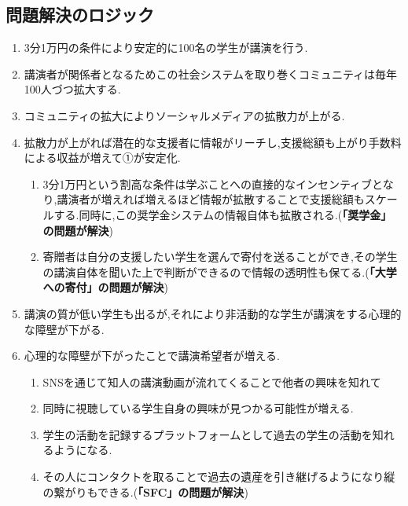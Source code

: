 \documentclass[uplatex, a4j]{jsarticle}
\begin{document}
\subsection{問題解決のロジック}
  \begin{enumerate}
    \item 3分1万円の条件により安定的に100名の学生が講演を行う.
    \item 講演者が関係者となるためこの社会システムを取り巻くコミュニティは毎年100人づつ拡大する.
    \item コミュニティの拡大によりソーシャルメディアの拡散力が上がる.
    \item 拡散力が上がれば潜在的な支援者に情報がリーチし,支援総額も上がり手数料による収益が増えて①が安定化.
      \begin{enumerate}
        \item 3分1万円という割高な条件は学ぶことへの直接的なインセンティブとなり,講演者が増えれば増えるほど情報が拡散することで支援総額もスケールする.同時に,この奨学金システムの情報自体も拡散される.(\textbf{「奨学金」の問題が解決})
        \item 寄贈者は自分の支援したい学生を選んで寄付を送ることができ,その学生の講演自体を聞いた上で判断ができるので情報の透明性も保てる.(\textbf{「大学への寄付」の問題が解決})
      \end{enumerate}
    \item 講演の質が低い学生も出るが,それにより非活動的な学生が講演をする心理的な障壁が下がる.
    \item 心理的な障壁が下がったことで講演希望者が増える.
      \begin{enumerate}
        \item SNSを通じて知人の講演動画が流れてくることで他者の興味を知れて
        \item 同時に視聴している学生自身の興味が見つかる可能性が増える.
        \item 学生の活動を記録するプラットフォームとして過去の学生の活動を知れるようになる.
        \item その人にコンタクトを取ることで過去の遺産を引き継げるようになり縦の繋がりもできる.(\textbf{「SFC」の問題が解決})
      \end{enumerate}

\end{enumerate}
\end{document}
